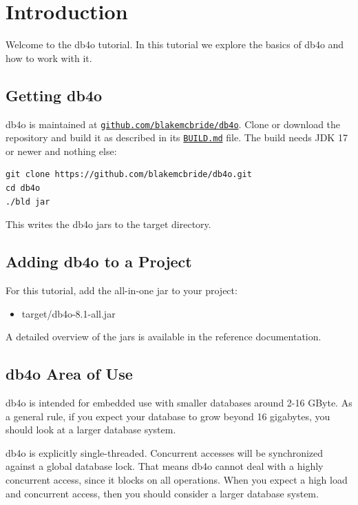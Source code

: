 
\chapter{Introduction}
\label{tut:welcome}

Welcome to the db4o tutorial. In this tutorial we explore the basics of db4o and how to work with it.

\section*{Getting db4o}

db4o is maintained at \href{https://github.com/blakemcbride/db4o}{\nolinkurl{github.com/blakemcbride/db4o}}. Clone or download the repository and build it as described in its \href{https://github.com/blakemcbride/db4o/blob/master/BUILD.md}{\nolinkurl{BUILD.md}} file. The build needs JDK 17 or newer and nothing else:

\begin{lstlisting}
git clone https://github.com/blakemcbride/db4o.git
cd db4o
./bld jar
\end{lstlisting}

This writes the db4o jars to the target directory.

\section*{Adding db4o to a Project}

For this tutorial, add the all-in-one jar to your project:

\begin{itemize}
\item target/db4o-8.1-all.jar
\end{itemize}

A detailed overview of the jars is available in the reference documentation.

\section*{db4o Area of Use}

db4o is intended for embedded use with smaller databases around 2-16 GByte. As a general rule, if you expect your database to grow beyond 16 gigabytes, you should look at a larger database system.

db4o is explicitly single-threaded. Concurrent accesses will be synchronized against a global database lock. That means db4o cannot deal with a highly concurrent access, since it blocks on all operations. When you expect a high load and concurrent access, then you should consider a larger database system.


